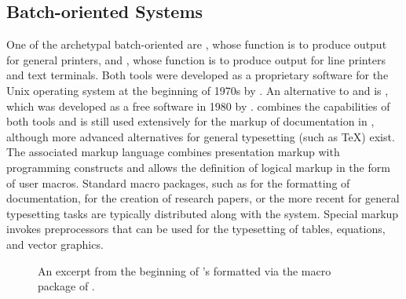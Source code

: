 \subsection{Batch-oriented Systems}
One of the archetypal batch-oriented  are %
, whose function is to produce output for general
printers, and %
, whose function is to
produce output for line printers and text terminals. Both tools were developed
as a proprietary software for the Unix operating system at the beginning of
1970s by . An alternative to  and 
is , which
was developed as a free software in 1980 by . 
combines the capabilities of both tools and is still used extensively for the
markup of documentation in \Unices, although more advanced alternatives for
general typesetting (such as \TeX) exist. The associated markup language
combines presentation markup with programming constructs and allows the
definition of logical markup in the form of user macros. Standard macro
packages, such as  for the
 formatting of documentation,
  for the creation
of research papers, or the more recent 
 for general typesetting tasks
are typically distributed along with the system. Special markup invokes
preprocessors that can be used for the typesetting of tables, equations, and
vector graphics.

\begin{figure}
  \caption{An excerpt from the beginning of 's
     formatted
    via the  macro package of .}
  \label{fig:poe}
\end{figure}


